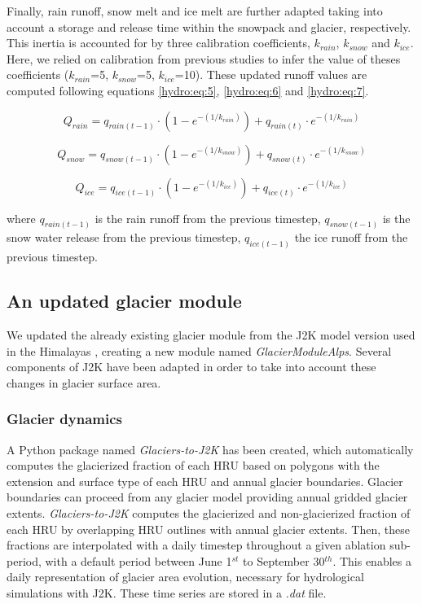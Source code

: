 Finally, rain runoff, snow melt and ice melt are further adapted taking into account a storage and release time within the snowpack and glacier, respectively. This inertia is accounted for by three calibration coefficients, $k_{rain}$, $k_{snow}$ and $k_{ice}$. Here, we relied on calibration from previous studies to infer the value of theses coefficients ($k_{rain}$=5, $k_{snow}$=5, $k_{ice}$=10). These updated runoff values are computed following equations \ref{hydro:eq:5}, \ref{hydro:eq:6} and \ref{hydro:eq:7}.

\begin{equation} \label{hydro:eq:5}
Q_{rain} = q_{rain(t-1)}\cdot (1-e^{-(1/k_{rain})}) + q_{rain(t)} \cdot e^{-(1/k_{rain})}
\end{equation} 

\begin{equation} \label{hydro:eq:6}
Q_{snow} = q_{snow(t-1)}\cdot (1-e^{-(1/k_{snow})}) + q_{snow(t)} \cdot e^{-(1/k_{snow})}
\end{equation} 

\begin{equation} \label{hydro:eq:7}
Q_{ice} = q_{ice(t-1)} \cdot (1-e^{-(1/k_{ice})}) + q_{ice(t)} \cdot e^{-(1/k_{ice})}
\end{equation} 

where $q_{rain(t-1)}$ is the rain runoff from the previous timestep, $q_{snow(t-1)}$ is the snow water release from the previous timestep, $q_{ice(t-1)}$ the ice runoff from the previous timestep.

\subsection{An updated glacier module}

We updated the already existing glacier module from the J2K model version used in the Himalayas \citep{nepal_understanding_2014}, creating a new module named \textit{GlacierModuleAlps}. Several components of J2K have been adapted in order to take into account these changes in glacier surface area. 

\subsubsection{Glacier dynamics}

A Python package named \textit{Glaciers-to-J2K} has been created, which automatically computes the glacierized fraction of each HRU based on polygons with the extension and surface type of each HRU and annual glacier boundaries. Glacier boundaries can proceed from any glacier model providing annual gridded glacier extents. \textit{Glaciers-to-J2K} computes the glacierized and non-glacierized fraction of each HRU by overlapping HRU outlines with annual glacier extents. Then, these fractions are interpolated with a daily timestep throughout a given ablation sub-period, with a default period between June 1$^{st}$ to September 30$^{th}$. This enables a daily representation of glacier area evolution, necessary for hydrological simulations with J2K. These time series are stored in a \textit{.dat} file.

